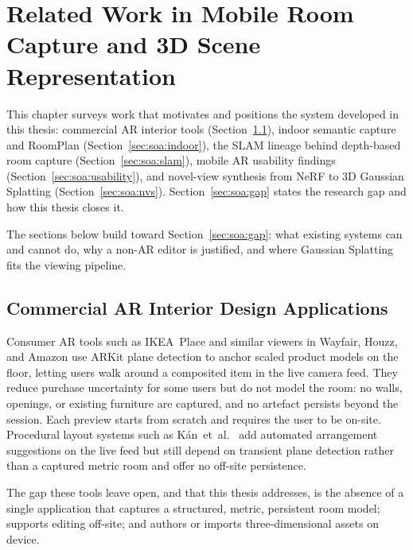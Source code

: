 \chapter{Related Work in Mobile Room Capture and 3D Scene Representation}
\label{ch:soa}

This chapter surveys work that motivates and positions the system developed
in this thesis: commercial AR interior tools (Section~\ref{sec:soa:commercial}),
indoor semantic capture and RoomPlan (Section~\ref{sec:soa:indoor}), the
SLAM lineage behind depth-based room capture (Section~\ref{sec:soa:slam}),
mobile AR usability findings (Section~\ref{sec:soa:usability}), and novel-view
synthesis from NeRF to 3D Gaussian Splatting (Section~\ref{sec:soa:nvs}).
Section~\ref{sec:soa:gap} states the research gap and how this thesis closes it.

The sections below build toward Section~\ref{sec:soa:gap}: what existing systems
can and cannot do, why a non-AR editor is justified, and where Gaussian
Splatting fits the viewing pipeline.

\section{Commercial AR Interior Design Applications}
\label{sec:soa:commercial}

Consumer AR tools such as IKEA~Place and similar viewers in Wayfair, Houzz,
and Amazon use ARKit plane detection to anchor scaled product models on the
floor, letting users walk around a composited item in the live camera feed.
They reduce purchase uncertainty for some users but do not model the room:
no walls, openings, or existing furniture are captured, and no artefact
persists beyond the session. Each preview starts from scratch and requires
the user to be on-site. Procedural layout systems such as
K{\'a}n~et~al.~\cite{kan2021ar} add automated arrangement suggestions on the
live feed but still depend on transient plane detection rather than a captured
metric room and offer no off-site persistence.

The gap these tools leave open, and that this thesis addresses, is the
absence of a single application that captures a structured, metric, persistent
room model; supports editing off-site; and authors or imports three-dimensional
assets on device.

